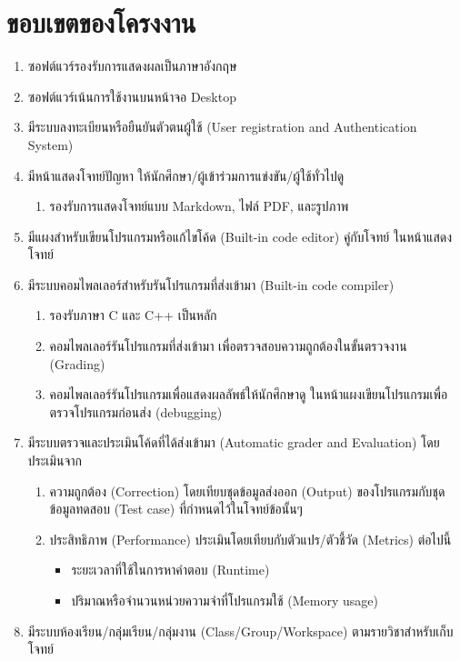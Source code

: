 \documentclass[12pt,one side,openright,a4paper]{cpe-thesis-th}
\begin{document}
\section{ขอบเขตของโครงงาน}
\begin{enumerate}
    \item ซอฟต์แวร์รองรับการแสดงผลเป็นภาษาอังกฤษ
    \item ซอฟต์แวร์เน้นการใช้งานบนหน้าจอ Desktop
    \item มีระบบลงทะเบียนหรือยืนยันตัวตนผู้ใช้ (User registration and Authentication System)
    \item มีหน้าแสดงโจทย์ปัญหา ให้นักศึกษา/ผู้เข้าร่วมการแข่งขัน/ผู้ใช้ทั่วไปดู
    \begin{enumerate}
        \item รองรับการแสดงโจทย์แบบ Markdown, ไฟล์ PDF, และรูปภาพ
    \end{enumerate}
    \item มีแผงสำหรับเขียนโปรแกรมหรือแก้ไขโค้ด (Built-in code editor) คู่กับโจทย์ ในหน้าแสดงโจทย์
    \item มีระบบคอมไพลเลอร์สำหรับรันโปรแกรมที่ส่งเข้ามา (Built-in code compiler)
    \begin{enumerate}
        \item รองรับภาษา C และ C++ เป็นหลัก
        \item คอมไพลเลอร์รันโปรแกรมที่ส่งเข้ามา เพื่อตรวจสอบความถูกต้องในขั้นตรวจงาน (Grading)
        \item คอมไพลเลอร์รันโปรแกรมเพื่อแสดงผลลัพธ์ให้นักศึกษาดู ในหน้าแผงเขียนโปรแกรมเพื่อตรวจโปรแกรมก่อนส่ง (debugging)
    \end{enumerate} 
    \item มีระบบตรวจและประเมินโค้ดที่ได้ส่งเข้ามา (Automatic grader and Evaluation) โดยประเมินจาก
    \begin{enumerate}
        \item ความถูกต้อง (Correction) โดยเทียบชุดข้อมูลส่งออก (Output) ของโปรแกรมกับชุดข้อมูลทดสอบ (Test case) ที่กำหนดไว้ในโจทย์ข้อนั้นๆ
        \item ประสิทธิภาพ (Performance) ประเมินโดยเทียบกับตัวแปร/ตัวชี้วัด (Metrics) ต่อไปนี้
        \begin{itemize}
            \item ระยะเวลาที่ใช้ในการหาคำตอบ (Runtime)
            \item ปริมาณหรือจำนวนหน่วยความจำที่โปรแกรมใช้ (Memory usage)
        \end{itemize}
    \end{enumerate}
    \item มีระบบห้องเรียน/กลุ่มเรียน/กลุ่มงาน (Class/Group/Workspace) ตามรายวิชาสำหรับเก็บโจทย์

\end{enumerate}
\end{document}
